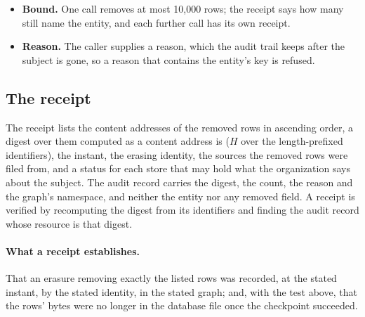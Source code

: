 \begin{itemize}[leftmargin=*,itemsep=2pt]
  so frames written before the erasure leave the file~\cite{sqlitedocs}. A test
  reads the bytes of the database file, its write-ahead log and its rollback
  journal before and after, in both journal modes, and requires the subject's
  key to be present before and absent after. If the checkpoint fails, the
  erasure stands, every
  read has lost the rows, and the failure is logged: the bytes leave at the next
  checkpoint.
\item \textbf{Bound.} One call removes at most 10{,}000 rows; the receipt says
  how many still name the entity, and each further call has its own receipt.
\item \textbf{Reason.} The caller supplies a reason, which the audit trail keeps
  after the subject is gone, so a reason that contains the entity's key is
  refused.
\end{itemize}

\subsection{The receipt}

The receipt lists the content addresses of the removed rows in ascending order,
a digest over them computed as a content address is ($H$ over the
length-prefixed identifiers), the instant, the erasing identity, the sources the
removed rows were filed from, and a status for each store that may hold what the
organization says about the subject. The audit record carries the digest, the
count, the reason and the graph's namespace, and neither the entity nor any
removed field. A receipt is verified by recomputing the digest from its
identifiers and finding the audit record whose resource is that digest.

\paragraph{What a receipt establishes.} That an erasure removing exactly the
listed rows was recorded, at the stated instant, by the stated identity, in the
stated graph; and, with the test above, that the rows' bytes were no longer in
the database file once the checkpoint succeeded.

